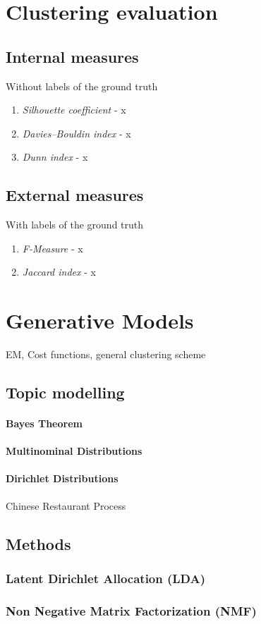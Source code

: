 \section{Clustering evaluation}

  \subsection{Internal measures}
    Without labels of the ground truth

    \begin{enumerate}
      \item \emph{Silhouette coefficient} - x
      \item \emph{Davies–Bouldin index} - x
      \item \emph{Dunn index} - x
    \end{enumerate}

  \subsection{External measures}
    With labels of the ground truth

    \begin{enumerate}
      \item \emph{F-Measure} - x
      \item \emph{Jaccard index} - x
    \end{enumerate}

\section{Generative Models}    
  
  EM, Cost functions, general clustering scheme

  \subsection{Topic modelling}
    \paragraph{Bayes Theorem}
    \paragraph{Multinominal Distributions}
    \paragraph{Dirichlet Distributions}
      Chinese Restaurant Process

  \subsection{Methods}
    \subsubsection{Latent Dirichlet Allocation (LDA)}
    \subsubsection{Non Negative Matrix Factorization (NMF)}


